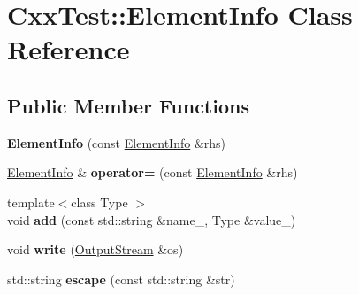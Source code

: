 \hypertarget{classCxxTest_1_1ElementInfo}{\section{Cxx\-Test\-:\-:Element\-Info Class Reference}
\label{classCxxTest_1_1ElementInfo}
}
\subsection*{Public Member Functions}
\begin{DoxyCompactItemize}
\item 
\hypertarget{classCxxTest_1_1ElementInfo_af577f64e81c279a003898ba3d8ceffcb}{{\bfseries Element\-Info} (const \hyperlink{classCxxTest_1_1ElementInfo}{Element\-Info} \&rhs)}\label{classCxxTest_1_1ElementInfo_af577f64e81c279a003898ba3d8ceffcb}

\item 
\hypertarget{classCxxTest_1_1ElementInfo_a53b08224991e1c0cf2f0321186cfc0cc}{\hyperlink{classCxxTest_1_1ElementInfo}{Element\-Info} \& {\bfseries operator=} (const \hyperlink{classCxxTest_1_1ElementInfo}{Element\-Info} \&rhs)}\label{classCxxTest_1_1ElementInfo_a53b08224991e1c0cf2f0321186cfc0cc}

\item 
\hypertarget{classCxxTest_1_1ElementInfo_ab23be1c4afc1250d01efa9a277c63411}{{\footnotesize template$<$class Type $>$ }\\void {\bfseries add} (const std\-::string \&name\-\_\-, Type \&value\-\_\-)}\label{classCxxTest_1_1ElementInfo_ab23be1c4afc1250d01efa9a277c63411}

\item 
\hypertarget{classCxxTest_1_1ElementInfo_a55047cf35e4208b8b58e7570de75c81b}{void {\bfseries write} (\hyperlink{classCxxTest_1_1OutputStream}{Output\-Stream} \&os)}\label{classCxxTest_1_1ElementInfo_a55047cf35e4208b8b58e7570de75c81b}

\item 
\hypertarget{classCxxTest_1_1ElementInfo_ae8d1b9bfff2bdc2feee7f6a8b1d5bba9}{std\-::string {\bfseries escape} (const std\-::string \&str)}\label{classCxxTest_1_1ElementInfo_ae8d1b9bfff2bdc2feee7f6a8b1d5bba9}

\end{DoxyCompactItemize}
